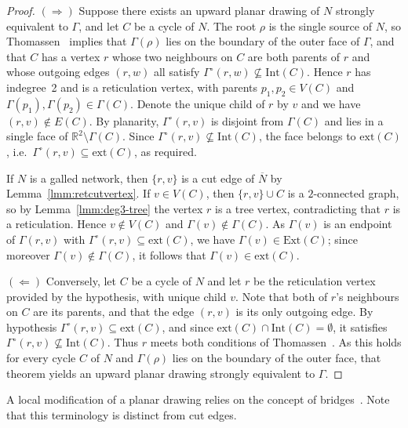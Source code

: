 \documentclass[pdflatex,sn-mathphys-num]{sn-jnl}
\theoremstyle{thmstyleone}%
\theoremstyle{thmstyletwo}%
\theoremstyle{thmstylethree}%
\begin{document}
\begin{proof}

$(\Rightarrow)$ Suppose there exists an upward planar drawing of $N$ strongly equivalent to $\Gamma$, and let $C$ be a cycle of $N$. The root $\rho$ is the single source of $N$, so Thomassen~\cite[Thm.~5.1]{Thomassen1989} implies that $\Gamma(\rho)$ lies on the boundary of the outer face of $\Gamma$, and that $C$ has a vertex $r$ whose two neighbours on $C$ are both parents of $r$ and whose outgoing edges $(r,w)$ all satisfy $\Gamma^\circ(r,w)\not\subseteq\mathrm{Int}(C)$. Hence $r$ has indegree~2 and is a reticulation vertex, with parents $p_1,p_2\in V(C)$ and $\Gamma(p_1),\Gamma(p_2)\in\Gamma(C)$. Denote the unique child of $r$ by $v$ and we have $(r,v) \notin E(C)$. By planarity, $\Gamma^\circ(r,v)$ is disjoint from $\Gamma(C)$ and lies in a single face of $\mathbb{R}^2\setminus\Gamma(C)$. Since $\Gamma^\circ(r,v)\not\subseteq\mathrm{Int}(C)$, the face belongs to $\mathrm{ext}(C)$, i.e.\ $\Gamma^\circ(r,v)\subseteq\mathrm{ext}(C)$, as required.

If $N$ is a galled network, then $\{r,v\}$ is a cut edge of $\overline{N}$ by Lemma~\ref{lmm:retcutvertex}. If $v\in V(C)$, then $\{r,v\}\cup C$ is a $2$-connected graph, so by Lemma~\ref{lmm:deg3-tree} the vertex $r$ is a tree vertex, contradicting that $r$ is a reticulation. Hence $v\notin V(C)$ and $\Gamma(v)\notin\Gamma(C)$. As $\Gamma(v)$ is an endpoint of $\Gamma(r,v)$ with $\Gamma^\circ(r,v)\subseteq\mathrm{ext}(C)$, we have $\Gamma(v)\in\mathrm{Ext}(C)$; since moreover $\Gamma(v)\notin\Gamma(C)$, it follows that $\Gamma(v)\in\mathrm{ext}(C)$.


$(\Leftarrow)$ Conversely, let $C$ be a cycle of $N$ and let $r$ be the reticulation vertex provided by the hypothesis, with unique child $v$. Note that both of $r$'s neighbours on $C$ are its parents, and that the edge $(r, v)$ is its only outgoing edge.  By hypothesis $\Gamma^\circ(r,v)\subseteq\mathrm{ext}(C)$, and since $\mathrm{ext}(C)\cap\mathrm{Int}(C)=\emptyset$, it satisfies $\Gamma^\circ(r,v)\not\subseteq\mathrm{Int}(C)$. Thus $r$ meets both conditions of Thomassen~\cite[Thm.~5.1]{Thomassen1989}. As this holds for every cycle $C$ of $N$ and $\Gamma(\rho)$ lies on the boundary of the outer face, that theorem yields an upward planar drawing strongly equivalent to $\Gamma$.
\end{proof}



A local modification of a planar drawing relies on the concept of bridges~\cite[Section 9.4]{BoMu}. Note that this terminology is distinct from cut edges.
\end{document}
